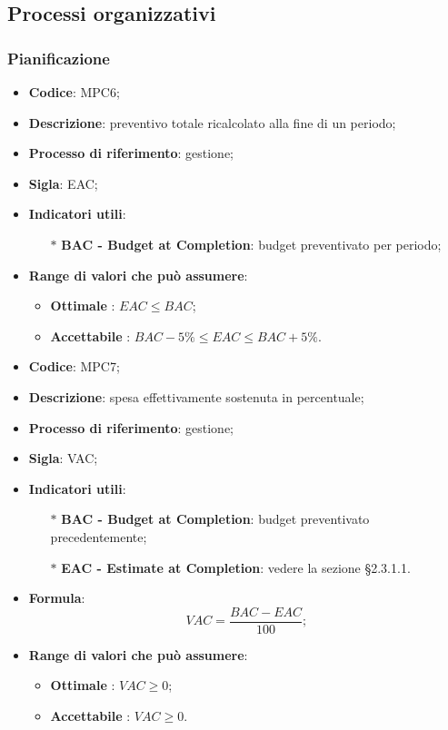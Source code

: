 \subsection{Processi organizzativi}
\subsubsection{Pianificazione}
\vspace{-1cm}
\begin{itemize}
	\item \textbf{Codice}: MPC6;
	\item \textbf{Descrizione}: preventivo totale ricalcolato alla fine di un periodo;
	\item \textbf{Processo di riferimento}: gestione;
	\item \textbf{Sigla}: EAC;
	\item \textbf{Indicatori utili}: 
		\begin{itemize}
		\item[$\ast$] \textbf{BAC - Budget at Completion}: budget preventivato per periodo;
		\end{itemize}
	\item \textbf{Range di valori che può assumere}: 
		\begin{itemize}
			\item \textbf{Ottimale} : $EAC \leq BAC$;
			\item \textbf{Accettabile} : $BAC - 5 \% \leq EAC \leq BAC + 5 \%$.
		\end{itemize}
\end{itemize}
\vspace{-1cm}
\begin{itemize}
	\item \textbf{Codice}: MPC7;
	\item \textbf{Descrizione}: spesa effettivamente sostenuta in percentuale;
	\item \textbf{Processo di riferimento}: gestione;
	\item \textbf{Sigla}: VAC;
	\item \textbf{Indicatori utili}: 
		\begin{itemize}
		\item[$\ast$] \textbf{BAC - Budget at Completion}: budget preventivato precedentemente;
		\item[$\ast$] \textbf{EAC - Estimate at Completion}: vedere la sezione §2.3.1.1.
		\end{itemize}
	\item \textbf{Formula}: \[ VAC = \frac{BAC - EAC}{100};\]
	\item \textbf{Range di valori che può assumere}: 
		\begin{itemize}
			\item \textbf{Ottimale} : $ VAC \geq 0 $;
			\item \textbf{Accettabile} : $ VAC \geq 0 $.
		\end{itemize}
\end{itemize}
